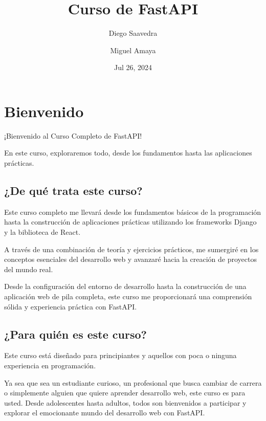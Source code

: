 \documentclass[
  a4paper,
  DIV=11,
  numbers=noendperiod,
  onepage,
  openany]{scrreprt}
\title{Curso de FastAPI}
\author{Diego Saavedra \and Miguel Amaya}
\date{Jul 26, 2024}
\renewcommand*\contentsname{Table of contents}
\newcommand\contentsname{Table of contents}
\begin{document}
\maketitle

\renewcommand*\contentsname{Table of contents}
{
\hypersetup{linkcolor=}
\setcounter{tocdepth}{2}
\tableofcontents
}


\chapter{Bienvenido}\label{bienvenido}

¡Bienvenido al Curso Completo de FastAPI!

En este curso, exploraremos todo, desde los fundamentos hasta las
aplicaciones prácticas.

\section{¿De qué trata este curso?}\label{de-quuxe9-trata-este-curso}

Este curso completo me llevará desde los fundamentos básicos de la
programación hasta la construcción de aplicaciones prácticas utilizando
los frameworks Django y la biblioteca de React.

A través de una combinación de teoría y ejercicios prácticos, me
sumergiré en los conceptos esenciales del desarrollo web y avanzaré
hacia la creación de proyectos del mundo real.

Desde la configuración del entorno de desarrollo hasta la construcción
de una aplicación web de pila completa, este curso me proporcionará una
comprensión sólida y experiencia práctica con FastAPI.

\section{¿Para quién es este curso?}\label{para-quiuxe9n-es-este-curso}

Este curso está diseñado para principiantes y aquellos con poca o
ninguna experiencia en programación.

Ya sea que sea un estudiante curioso, un profesional que busca cambiar
de carrera o simplemente alguien que quiere aprender desarrollo web,
este curso es para usted. Desde adolescentes hasta adultos, todos son
bienvenidos a participar y explorar el emocionante mundo del desarrollo
web con FastAPI.
\end{document}
